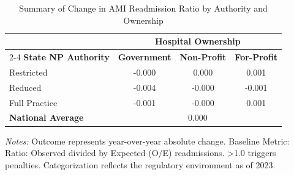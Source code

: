 \begin{table}[htbp]
    \centering
    \caption{Summary of Change in AMI Readmission Ratio by Authority and Ownership}
    \label{tab:d_rrp_excess_ratio_ami_own}
    \vspace{0.2cm}
    \begin{tabular}{lccc}
        \toprule
        & \multicolumn{3}{c}{\textbf{Hospital Ownership}} \\
        \cmidrule(lr){2-4}
        \textbf{State NP Authority} & \textbf{Government} & \textbf{Non-Profit} & \textbf{For-Profit} \\
        \midrule
        Restricted & -0.000 & 0.000 & 0.001 \\
        Reduced & -0.004 & -0.000 & -0.001 \\
        Full Practice & -0.001 & -0.000 & 0.001 \\
        \midrule
        \textbf{National Average} & \multicolumn{3}{c}{0.000} \\
        \bottomrule
    \end{tabular}
    \vspace{0.1cm}
    \begin{minipage}{0.85\textwidth}
        \footnotesize \textit{Notes:} Outcome represents year-over-year absolute change. Baseline Metric: Ratio: Observed divided by Expected (O/E) readmissions. >1.0 triggers penalties. Categorization reflects the regulatory environment as of 2023.
    \end{minipage}
\end{table}